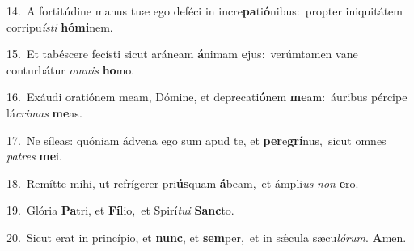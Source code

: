 {\numbfont\textcolor{\numbcolor}{14.}}~A fortitúdine manus tuæ ego deféci in incre\-\textbf{pa}\-ti\-\textbf{ó}\-nibus:~\star propter iniquitátem corripu\-\textit{ís}\-\textit{ti} \textbf{hó}\-\textbf{mi}nem.\par
{\numbfont\textcolor{\numbcolor}{15.}}~Et tabéscere fecísti sicut aráneam \textbf{á}\-nimam \textbf{e}\-jus:~\star verúmtamen vane conturbátur \textit{om}\-\textit{nis} \textbf{ho}\-mo.\par
{\numbfont\textcolor{\numbcolor}{16.}}~Exáudi oratiónem meam, Dómine, et deprecati\-\textbf{ó}\-nem \textbf{me}\-am:~\star áuribus pércipe lá\-\textit{cri}\-\textit{mas} \textbf{me}\-as.\par
{\numbfont\textcolor{\numbcolor}{17.}}~Ne síleas: quóniam ádvena ego sum apud te, et \textbf{per}\-e\-\textbf{grí}\-nus,~\star sicut omnes \textit{pa}\-\textit{tres} \textbf{me}\-i.\par
{\numbfont\textcolor{\numbcolor}{18.}}~Remítte mihi, ut refrígerer pri\-\textbf{ús}\-quam \textbf{á}\-beam,~\star et ámpli\textit{us} \textit{non} \textbf{e}\-ro.\par
{\numbfont\textcolor{\numbcolor}{19.}}~Glória \textbf{Pa}\-tri, et \textbf{Fí}\-lio,~\star et Spirí\-\textit{tu}\-\textit{i} \textbf{Sanc}\-to.\par
{\numbfont\textcolor{\numbcolor}{20.}}~Sicut erat in princípio, et \textbf{nunc}\-, et \textbf{sem}\-per,~\star et in sǽcula sæcu\-\textit{ló}\-\textit{rum}. \textbf{A}\-men.\par
